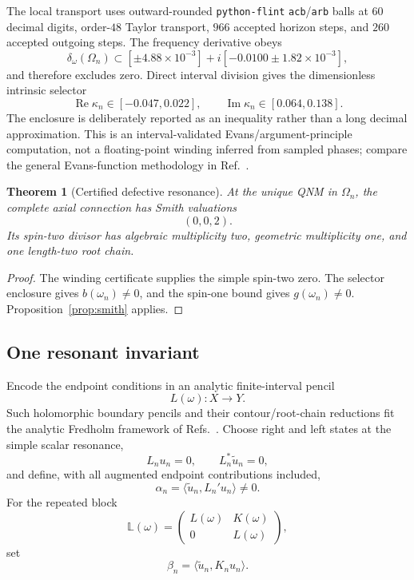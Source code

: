 \documentclass[11pt]{article}
\newtheorem{theorem}{Theorem}[section]
\theoremstyle{remark}
\begin{document}
The local transport uses outward-rounded \texttt{python-flint}
\texttt{acb}/\texttt{arb} balls at \(60\) decimal digits, order-\(48\)
Taylor transport, \(966\) accepted horizon steps, and \(260\) accepted
outgoing steps.  The frequency derivative obeys
\[
 \delta_\omega(\Omega_n)
 \subset
 [\pm4.88\times10^{-3}]
 +i[-0.0100\pm1.82\times10^{-3}],
\]
and therefore excludes zero.  Direct interval division gives the
dimensionless intrinsic selector
\begin{equation}\label{eq:kappa-enclosure}
 \boxed{\;
 \operatorname{Re}\kappa_n\in[-0.047,0.022],
 \qquad
 \operatorname{Im}\kappa_n\in[0.064,0.138].
 \;}
\end{equation}
The enclosure is deliberately reported as an inequality rather than a
long decimal approximation.
This is an interval-validated Evans/argument-principle computation, not a
floating-point winding inferred from sampled phases; compare the general
Evans-function methodology in Ref.~\cite{barker2018}.

\begin{theorem}[Certified defective resonance]\label{thm:certified-ep2}
At the unique QNM in \(\Omega_n\), the complete axial connection has
Smith valuations
\[
 \boxed{\;(0,0,2).\;}
\]
Its spin-two divisor has algebraic multiplicity two, geometric
multiplicity one, and one length-two root chain.
\end{theorem}

\begin{proof}
The winding certificate supplies the simple spin-two zero.  The selector
enclosure gives \(b(\omega_n)\ne0\), and the spin-one bound gives
\(g(\omega_n)\ne0\).  Proposition~\ref{prop:smith} applies.
\end{proof}

\subsection{One resonant invariant}

Encode the endpoint conditions in an analytic finite-interval pencil
\[
 L(\omega):X\longrightarrow Y.
\]
Such holomorphic boundary pencils and their contour/root-chain reductions
fit the analytic Fredholm framework of
Refs.~\cite{beyn2012,beynlatushkin2014}.
Choose right and left states at the simple scalar resonance,
\[
 L_nu_n=0,\qquad L_n^*\widetilde u_n=0,
\]
and define, with all augmented endpoint contributions included,
\[
 \alpha_n=
 \langle\widetilde u_n,L_n'u_n\rangle\ne0.
\]
For the repeated block
\[
 \mathbb L(\omega)=
 \begin{pmatrix}L(\omega)&K(\omega)\\0&L(\omega)\end{pmatrix},
\]
set
\[
 \beta_n=\langle\widetilde u_n,K_nu_n\rangle.
\]
\end{document}

